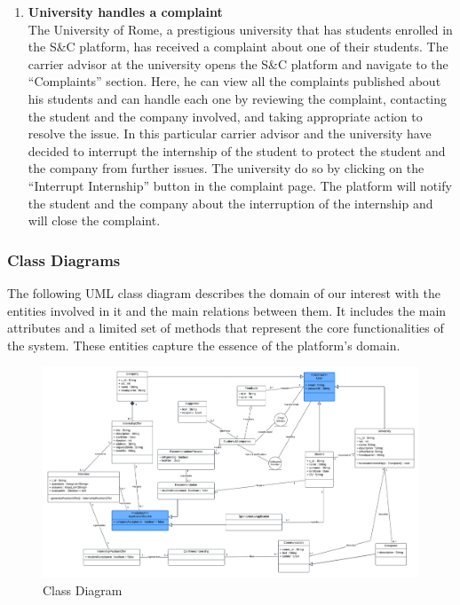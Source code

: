 \begin{enumerate}
    \item \textbf{\textcolor{titleColor}{University handles a complaint}}\\
        The University of Rome, a prestigious university that has students enrolled in the S\&C platform, has received a complaint about one of their students. The carrier advisor at the university opens the S\&C platform and navigate to the “Complaints” section. Here, he can view all the complaints published about his students and can handle each one by reviewing the complaint, contacting the student and the company involved, and taking appropriate action to resolve the issue.
        In this particular carrier advisor and the university have decided to interrupt the internship of the student to protect the student and the company from further issues. The university do so by clicking on the “Interrupt Internship” button in the complaint page. The platform will notify the student and the company about the interruption of the internship and will close the complaint.
\end{enumerate}
\clearpage
\subsubsection{Class Diagrams}
The following UML class diagram describes the domain of our interest with the entities involved in it and the main relations between them. It includes the main attributes and a limited set of methods that represent the core functionalities of the system. These entities capture the essence of the platform's domain.
\begin{figure}[H]
    \centering
    \includegraphics[width=\linewidth]{Latex/Images/ClassDiagram1.1.png}
    \caption{Class Diagram}
    \label{fig:ClassDiagram}
\end{figure}
\clearpage
